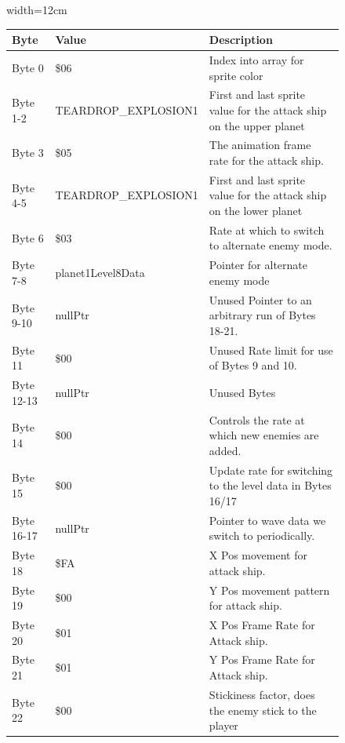 \begin{figure}[H]
{\begin{adjustbox}{width=12cm}
\begin{tabular}{lll}
\toprule
 Byte       & Value               & Description                                                         \\
\midrule
 Byte 0     & \$06                 & Index into array for sprite color                                   \\
 Byte 1-2   & TEARDROP\_EXPLOSION1 & First and last sprite value for the attack ship on the upper planet \\
 Byte 3     & \$05                 & The animation frame rate for the attack ship.                       \\
 Byte 4-5   & TEARDROP\_EXPLOSION1 & First and last sprite value for the attack ship on the lower planet \\
 Byte 6     & \$03                 & Rate at which to switch to alternate enemy mode.                    \\
 Byte 7-8   & planet1Level8Data   & Pointer for alternate enemy mode                                    \\
 Byte 9-10  & nullPtr             & Unused Pointer to an arbitrary run of Bytes 18-21.                  \\
 Byte 11    & \$00                 & Unused Rate limit for use of Bytes 9 and 10.                        \\
 Byte 12-13 & nullPtr             & Unused Bytes                                                        \\
 Byte 14    & \$00                 & Controls the rate at which new enemies are added.                   \\
 Byte 15    & \$00                 & Update rate for switching to the level data in Bytes 16/17          \\
 Byte 16-17 & nullPtr             & Pointer to wave data we switch to periodically.                     \\
 Byte 18    & \$FA                 & X Pos movement for attack ship.                                     \\
 Byte 19    & \$00                 & Y Pos movement pattern for attack ship.                             \\
 Byte 20    & \$01                 & X Pos Frame Rate for Attack ship.                                   \\
 Byte 21    & \$01                 & Y Pos Frame Rate for Attack ship.                                   \\
 Byte 22    & \$00                 & Stickiness factor, does the enemy stick to the player               \\

\end{tabular}
\end{adjustbox}}
\end{figure}
